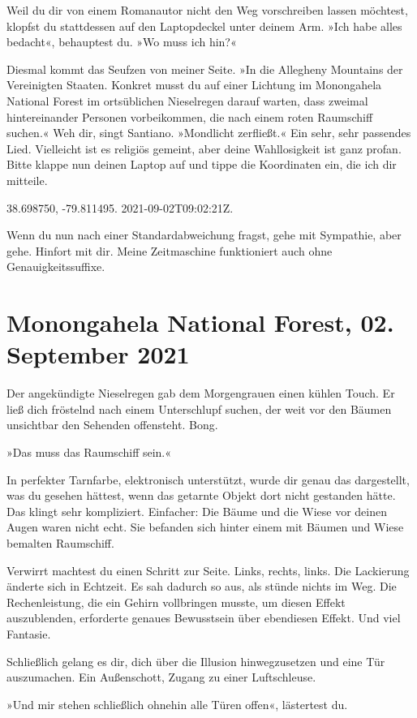 Weil du dir von einem Romanautor nicht den Weg vorschreiben lassen möchtest, klopfst du stattdessen auf den Laptopdeckel unter deinem Arm. »Ich habe alles bedacht«, behauptest du. »Wo muss ich hin?«

Diesmal kommt das Seufzen von meiner Seite. »In die Allegheny Mountains der Vereinigten Staaten. Konkret musst du auf einer Lichtung im Monongahela National Forest im ortsüblichen Nieselregen darauf warten, dass zweimal hintereinander Personen vorbeikommen, die nach einem roten Raumschiff suchen.« Weh dir, singt Santiano. »Mondlicht zerfließt.« Ein sehr, sehr passendes Lied. Vielleicht ist es religiös gemeint, aber deine Wahllosigkeit ist ganz profan. Bitte klappe nun deinen Laptop auf und tippe die Koordinaten ein, die ich dir mitteile.

38.698750, -79.811495. 2021-09-02T09:02:21Z.

Wenn du nun nach einer Standardabweichung fragst, gehe mit Sympathie, aber gehe. Hinfort mit dir. Meine Zeitmaschine funktioniert auch ohne Genauigkeitssuffixe.


\chapter{Monongahela National Forest, 02. September 2021}

Der angekündigte Nieselregen gab dem Morgengrauen einen kühlen Touch. Er ließ dich fröstelnd nach einem Unterschlupf suchen, der weit vor den Bäumen unsichtbar den Sehenden offensteht. Bong.

»Das muss das Raumschiff sein.«

In perfekter Tarnfarbe, elektronisch unterstützt, wurde dir genau das dargestellt, was du gesehen hättest, wenn das getarnte Objekt dort nicht gestanden hätte. Das klingt sehr kompliziert. Einfacher: Die Bäume und die Wiese vor deinen Augen waren nicht echt. Sie befanden sich hinter einem mit Bäumen und Wiese bemalten Raumschiff.

Verwirrt machtest du einen Schritt zur Seite. Links, rechts, links. Die Lackierung änderte sich in Echtzeit. Es sah dadurch so aus, als stünde nichts im Weg. Die Rechenleistung, die ein Gehirn vollbringen musste, um diesen Effekt auszublenden, erforderte genaues Bewusstsein über ebendiesen Effekt. Und viel Fantasie.

Schließlich gelang es dir, dich über die Illusion hinwegzusetzen und eine Tür auszumachen. Ein Außenschott, Zugang zu einer Luftschleuse.

»Und mir stehen schließlich ohnehin alle Türen offen«, lästertest du.

